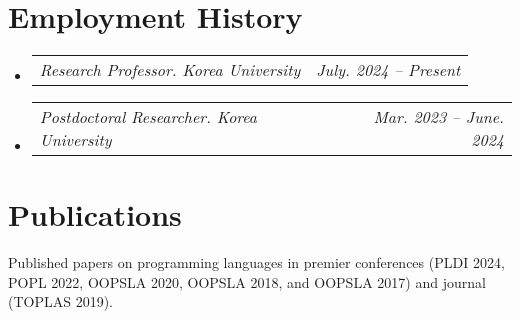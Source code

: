 \documentclass[letterpaper,11pt]{article}
\makeatletter
\newcommand{\resumeSubheadingTwo}[2]{
  \vspace{-2pt}\item
    \begin{tabular*}{1.0\textwidth}[t]{l@{\extracolsep{\fill}}r}
      \textit{#1} & \textit{#2} \\
    \end{tabular*}\vspace{-7pt}
}
\newcommand{\resumeSubheading}[4]{
  \vspace{-2pt}\item
    \begin{tabular*}{1.0\textwidth}[t]{l@{\extracolsep{\fill}}r}
      \textbf{#1} & \textbf{\small #2} \\
      \textit{\small#3} & \textit{\small #4} \\
    \end{tabular*}\vspace{-7pt}
}
\newcommand{\resumeSubHeadingListStart}{\begin{itemize}[leftmargin=0.0in, label={}]}
\newcommand{\resumeSubHeadingListEnd}{\end{itemize}}
\makeatother
\begin{document}
\section{Employment History}
\resumeSubHeadingListStart
    \resumeSubheadingTwo
    {Research Professor. Korea University}{July. 2024 -- Present}\vspace{-10pt}  
    \resumeSubheadingTwo
    {Postdoctoral Researcher. Korea University}{Mar. 2023 -- June. 2024}\vspace{-15pt}  
\resumeSubHeadingListEnd

\section{Publications}
Published papers on programming languages in premier conferences
(PLDI 2024, POPL 2022, OOPSLA 2020, OOPSLA 2018, and OOPSLA 2017) and
journal (TOPLAS 2019). 
\end{document}
